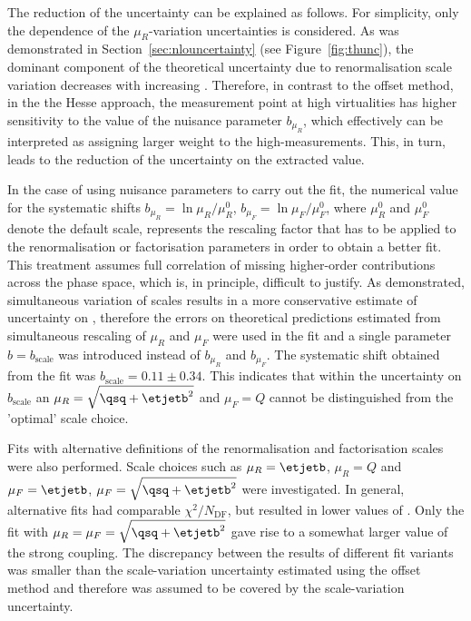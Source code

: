 The reduction of the \asz uncertainty can be explained as follows. For simplicity, only the \qsq dependence of the $\mu_R$-variation uncertainties is considered. As was demonstrated in Section~\ref{sec:nlouncertainty} (see Figure~\ref{fig:thunc}), the dominant component of the theoretical uncertainty due to renormalisation scale variation decreases with increasing \qsq. Therefore, in contrast to the offset method, in the the Hesse approach, the measurement point at high virtualities has higher sensitivity to the value of the nuisance parameter $b_{\mu_R}$, which effectively can be interpreted as assigning larger weight to the high-\qsq measurements. This, in turn, leads to the reduction of the uncertainty on the extracted \asz value. 

In the case of using nuisance parameters to carry out the fit, the numerical value for the systematic shifts $b_{\mu_R}=\ln{\mu_R/\mu_R^0}$, $b_{\mu_F}=\ln{\mu_F/\mu_F^0}$, where $\mu_R^0$ and $\mu_F^0$ denote the default scale, represents the rescaling factor that has to be applied to the renormalisation or factorisation parameters in order to obtain a better fit. This treatment assumes full correlation of missing higher-order contributions across the phase space, which is, in principle, difficult to justify. As demonstrated, simultaneous variation of scales results in a more conservative estimate of uncertainty on \as, therefore the errors on theoretical predictions estimated from simultaneous rescaling of $\mu_R$ and $\mu_F$ were used in the fit and a single parameter $b=b_\text{scale}$ was introduced instead of $b_{\mu_R}$ and $b_{\mu_F}$. The systematic shift obtained from the fit was $b_\text{scale}=0.11\pm 0.34$. This indicates that within the uncertainty on $b_\text{scale}$ an $\mu_R=\sqrt{\qsq+\etjetb^2}$ and $\mu_F=Q$ cannot be distinguished from the 'optimal' scale choice.

Fits with alternative definitions of the renormalisation and factorisation scales were also performed. Scale choices such as $\mu_R=\etjetb$, $\mu_R=Q$ and $\mu_F=\etjetb$, $\mu_F=\sqrt{\qsq+\etjetb^2}$ were investigated. In general, alternative fits had comparable $\chi^2/N_\text{DF}$, but resulted in lower values of \asz. Only the fit with $\mu_R=\mu_F=\sqrt{\qsq+\etjetb^2}$ gave rise to a somewhat larger value of the strong coupling. The discrepancy between the results of different fit variants was smaller than the scale-variation uncertainty estimated using the offset method and therefore was assumed to be covered by the scale-variation uncertainty.

